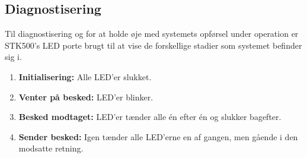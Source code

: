 \subsection{Diagnostisering}
Til diagnostisering og for at holde øje med systemets opførsel under operation er STK500's LED porte brugt til at vise de forskellige stadier som systemet befinder sig i.

\begin{enumerate}
	\item \textbf{Initialisering:} Alle LED'er slukket.
	\item \textbf{Venter på besked:} LED'er blinker.
	\item \textbf{Besked modtaget:} LED'er tænder alle én efter én og slukker bagefter.
	\item \textbf{Sender besked:} Igen tænder alle LED'erne en af gangen, men gående i den modsatte retning.
\end{enumerate}

